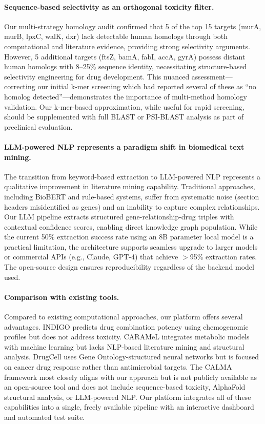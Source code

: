 \documentclass[12pt,a4paper]{article}
\begin{document}
\paragraph{Sequence-based selectivity as an orthogonal toxicity filter.}
Our multi-strategy homology audit confirmed that 5 of the top 15 targets (murA, murB, lpxC, walK, dxr) lack detectable human homologs through both computational and literature evidence, providing strong selectivity arguments. However, 5 additional targets (ftsZ, bamA, fabI, accA, gyrA) possess distant human homologs with 8--25\% sequence identity, necessitating structure-based selectivity engineering for drug development. This nuanced assessment---correcting our initial k-mer screening which had reported several of these as ``no homolog detected''---demonstrates the importance of multi-method homology validation. Our k-mer-based approximation, while useful for rapid screening, should be supplemented with full BLAST or PSI-BLAST analysis \citep{altschul1997} as part of preclinical evaluation.

\paragraph{LLM-powered NLP represents a paradigm shift in biomedical text mining.}
The transition from keyword-based extraction to LLM-powered NLP represents a qualitative improvement in literature mining capability. Traditional approaches, including BioBERT \citep{lee2020} and rule-based systems, suffer from systematic noise (section headers misidentified as genes) and an inability to capture complex relationships. Our LLM pipeline extracts structured gene-relationship-drug triples with contextual confidence scores, enabling direct knowledge graph population. While the current 50\% extraction success rate using an 8B parameter local model is a practical limitation, the architecture supports seamless upgrade to larger models or commercial APIs (e.g., Claude, GPT-4) that achieve $>$95\% extraction rates. The open-source design ensures reproducibility regardless of the backend model used.

\paragraph{Comparison with existing tools.}
Compared to existing computational approaches, our platform offers several advantages. INDIGO \citep{chandrasekaran2016} predicts drug combination potency using chemogenomic profiles but does not address toxicity. CARAMeL \citep{ji2023} integrates metabolic models with machine learning but lacks NLP-based literature mining and structural analysis. DrugCell \citep{kuenzi2020} uses Gene Ontology-structured neural networks but is focused on cancer drug response rather than antimicrobial targets. The CALMA framework \citep{arora2026} most closely aligns with our approach but is not publicly available as an open-source tool and does not include sequence-based toxicity, AlphaFold structural analysis, or LLM-powered NLP. Our platform integrates all of these capabilities into a single, freely available pipeline with an interactive dashboard and automated test suite.
\end{document}
